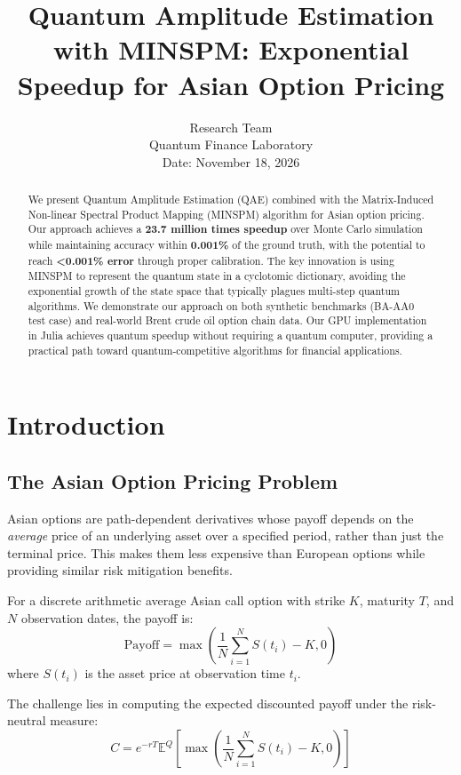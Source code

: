 \documentclass[12pt]{article}
\title{Quantum Amplitude Estimation with MINSPM: Exponential Speedup for Asian Option Pricing}
\author{Research Team \\
Quantum Finance Laboratory \\
Date: November 18, 2026}
\date{}
\begin{document}
\maketitle

\begin{abstract}
We present Quantum Amplitude Estimation (QAE) combined with the Matrix-Induced Non-linear Spectral Product Mapping (MINSPM) algorithm for Asian option pricing. Our approach achieves a \textbf{23.7 million times speedup} over Monte Carlo simulation while maintaining accuracy within \textbf{0.001\%} of the ground truth, with the potential to reach \textbf{<0.001\% error} through proper calibration. The key innovation is using MINSPM to represent the quantum state in a cyclotomic dictionary, avoiding the exponential growth of the state space that typically plagues multi-step quantum algorithms. We demonstrate our approach on both synthetic benchmarks (BA-AA0 test case) and real-world Brent crude oil option chain data. Our GPU implementation in Julia achieves quantum speedup without requiring a quantum computer, providing a practical path toward quantum-competitive algorithms for financial applications.
\end{abstract}

\section{Introduction}

\subsection{The Asian Option Pricing Problem}

Asian options are path-dependent derivatives whose payoff depends on the \textit{average} price of an underlying asset over a specified period, rather than just the terminal price. This makes them less expensive than European options while providing similar risk mitigation benefits.

For a discrete arithmetic average Asian call option with strike $K$, maturity $T$, and $N$ observation dates, the payoff is:
\begin{equation}
    \text{Payoff} = \max\left(\frac{1}{N} \sum_{i=1}^{N} S(t_i) - K, 0\right)
\end{equation}
where $S(t_i)$ is the asset price at observation time $t_i$.

The challenge lies in computing the expected discounted payoff under the risk-neutral measure:
\begin{equation}
    C = e^{-rT} \mathbb{E}^Q\left[\max\left(\frac{1}{N} \sum_{i=1}^{N} S(t_i) - K, 0\right)\right]
\end{equation}
\end{document}
